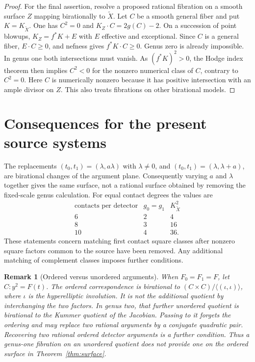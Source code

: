 \documentclass[11pt,a4paper]{article}
\newtheorem{remark}[theorem]{Remark}
\begin{document}
\begin{proof}
For the final assertion, resolve a proposed rational fibration on a
smooth surface $Z$ mapping birationally to $\widetilde X$. Let $C$ be
a smooth general fiber and put $K=K_{\widetilde X}$. One has
$C^2=0$ and $K_Z\cdot C=2g(C)-2$. On a succession of point blowups,
$K_Z=f^*K+E$ with $E$ effective and exceptional. Since $C$ is a general
fiber, $E\cdot C\ge0$, and nefness gives $f^*K\cdot C\ge0$.
Genus zero is already impossible. In genus one both intersections
must vanish. As $(f^*K)^2>0$, the Hodge index theorem then implies
$C^2<0$ for the nonzero numerical class of $C$, contrary to $C^2=0$.
Here $C$ is numerically nonzero because it has positive intersection
with an ample divisor on $Z$. This also treats fibrations on other
birational models.
\end{proof}

\section{Consequences for the present source systems}
The replacements $(t_0,t_1)=(\lambda,a\lambda)$ with $\lambda\ne0$,
and $(t_0,t_1)=(\lambda,\lambda+a)$, are birational changes of the
argument plane. Consequently varying $a$ and $\lambda$ together gives
the same surface, not a rational surface obtained by removing the
fixed-scale genus calculation. For equal contact degrees the values are
\[
\begin{array}{c|c|c}
\text{contacts per detector}&g_0=g_1&K_{\widetilde X}^2\\\hline
6&2&4\\
8&3&16\\
10&4&36.
\end{array}
\]
These statements concern matching first contact square classes after
nonzero square factors common to the source have been removed. Any
additional matching of complement classes imposes further conditions.

\begin{remark}[Ordered versus unordered arguments]
When $F_0=F_1=F$, let $C:y^2=F(t)$. The ordered correspondence is
birational to $(C\times C)/\langle(\iota,\iota)\rangle$, where
$\iota$ is the hyperelliptic involution. It is not the additional
quotient by interchanging the two factors. In genus two, that further
unordered quotient is birational to the Kummer quotient of the
Jacobian. Passing to it forgets the ordering and may replace two
rational arguments by a conjugate quadratic pair. Recovering two
\emph{rational} ordered detector arguments is a further condition.
Thus a genus-one fibration on an unordered quotient does not provide
one on the ordered surface in Theorem~\ref{thm:surface}.
\end{remark}
\end{document}
